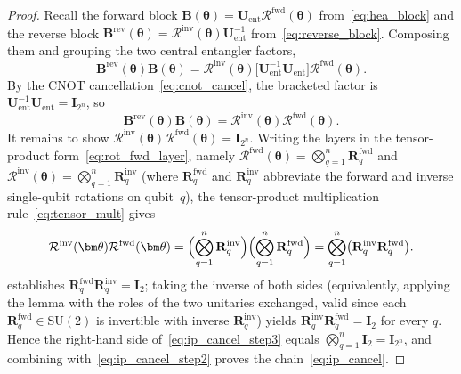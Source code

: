 \documentclass[11pt]{article}
\newcommand{\SU}{\mathrm{SU}}
\theoremstyle{plain}
\theoremstyle{plain}
\begin{document}
\begin{proof}
Recall the forward block $\mathbf{B}(\bm\theta)
=\mathbf{U}_{\mathrm{ent}} \mathcal{R}^{\mathrm{fwd}}(\bm\theta)$
from~\eqref{eq:hea_block} and the reverse block $\mathbf{B}^{\mathrm{rev}}(\bm\theta)
=\mathcal{R}^{\mathrm{inv}}(\bm\theta) \mathbf{U}_{\mathrm{ent}}^{-1}$
from~\eqref{eq:reverse_block}. Composing them and grouping the two
central entangler factors,
\begin{equation}\label{eq:ip_cancel_step1}
  \mathbf{B}^{\mathrm{rev}}(\bm\theta) \mathbf{B}(\bm\theta)
  = \mathcal{R}^{\mathrm{inv}}(\bm\theta) 
    \bigl[\mathbf{U}_{\mathrm{ent}}^{-1} \mathbf{U}_{\mathrm{ent}}\bigr] 
    \mathcal{R}^{\mathrm{fwd}}(\bm\theta).
\end{equation}
By the CNOT cancellation~\eqref{eq:cnot_cancel}, the bracketed factor is
$\mathbf{U}_{\mathrm{ent}}^{-1}\mathbf{U}_{\mathrm{ent}}=\mathbf{I}_{2^n}$, so
\begin{equation}\label{eq:ip_cancel_step2}
  \mathbf{B}^{\mathrm{rev}}(\bm\theta) \mathbf{B}(\bm\theta)
  = \mathcal{R}^{\mathrm{inv}}(\bm\theta) 
    \mathcal{R}^{\mathrm{fwd}}(\bm\theta).
\end{equation}
It remains to show $\mathcal{R}^{\mathrm{inv}}(\bm\theta) 
\mathcal{R}^{\mathrm{fwd}}(\bm\theta)=\mathbf{I}_{2^n}$. Writing the layers in
the tensor-product form~\eqref{eq:rot_fwd_layer}, namely
$\mathcal{R}^{\mathrm{fwd}}(\bm\theta)=\bigotimes_{q=1}^n
\mathbf{R}^{\mathrm{fwd}}_q$ and
$\mathcal{R}^{\mathrm{inv}}(\bm\theta)=\bigotimes_{q=1}^n
\mathbf{R}^{\mathrm{inv}}_q$ (where $\mathbf{R}^{\mathrm{fwd}}_q$ and
$\mathbf{R}^{\mathrm{inv}}_q$ abbreviate the forward and inverse single-qubit
rotations on qubit~$q$), the tensor-product multiplication
rule~\eqref{eq:tensor_mult} gives
\begin{equation}\label{eq:ip_cancel_step3}
  \mathcal{R}^{\mathrm{inv}}(\bm\theta) 
  \mathcal{R}^{\mathrm{fwd}}(\bm\theta)
  = \Bigl(\bigotimes_{q=1}^n \mathbf{R}^{\mathrm{inv}}_q\Bigr)
    \Bigl(\bigotimes_{q=1}^n \mathbf{R}^{\mathrm{fwd}}_q\Bigr)
  = \bigotimes_{q=1}^n
    \bigl(\mathbf{R}^{\mathrm{inv}}_q \mathbf{R}^{\mathrm{fwd}}_q\bigr).
\end{equation}
 establishes
$\mathbf{R}^{\mathrm{fwd}}_q \mathbf{R}^{\mathrm{inv}}_q=\mathbf{I}_2$; taking the inverse of
both sides (equivalently, applying the lemma with the roles of the two
unitaries exchanged, valid since each $\mathbf{R}^{\mathrm{fwd}}_q\in\SU(2)$ is
invertible with inverse $\mathbf{R}^{\mathrm{inv}}_q$) yields
$\mathbf{R}^{\mathrm{inv}}_q \mathbf{R}^{\mathrm{fwd}}_q=\mathbf{I}_2$ for every $q$. Hence
the right-hand side of~\eqref{eq:ip_cancel_step3} equals
$\bigotimes_{q=1}^n\mathbf{I}_2=\mathbf{I}_{2^n}$, and combining
with~\eqref{eq:ip_cancel_step2} proves the chain~\eqref{eq:ip_cancel}.
\end{proof}
\end{document}
